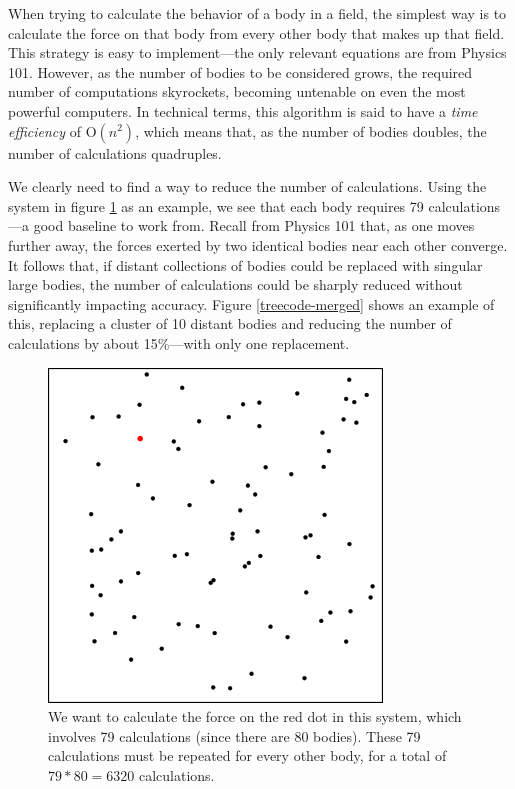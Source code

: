 \documentclass[thesis.tex]{subfiles}
\begin{document}
When trying to calculate the behavior of a body in a field, the simplest way is to calculate the force on that body from every other body that makes up that field. This strategy is easy to implement---the only relevant equations are from Physics 101. However, as the number of bodies to be considered grows, the required number of computations skyrockets, becoming untenable on even the most powerful computers. In technical terms, this algorithm is said to have a \emph{time efficiency} of O$(n^2)$, which means that, as the number of bodies doubles, the number of calculations quadruples.

We clearly need to find a way to reduce the number of calculations. Using the system in figure \ref{treecode-basic} as an example, we see that each body requires 79 calculations---a good baseline to work from. Recall from Physics 101 that, as one moves further away, the forces exerted by two identical bodies near each other converge. It follows that, if distant collections of bodies could be replaced with singular large bodies, the number of calculations could be sharply reduced without significantly impacting accuracy. Figure \ref{treecode-merged} shows an example of this, replacing a cluster of 10 distant bodies and reducing the number of calculations by about 15\%---with only one replacement.

\begin{figure}[p]
	\includegraphics{imgs/treecode-basic}
	\caption{We want to calculate the force on the red dot in this system, which involves 79 calculations (since there are 80 bodies). These 79 calculations must be repeated for every other body, for a total of $79*80=6320$ calculations.}
	\label{treecode-basic}
\end{figure}
\end{document}
